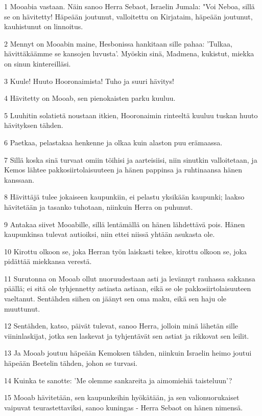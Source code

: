 \par 1 Mooabia vastaan. Näin sanoo Herra Sebaot, Israelin Jumala: "Voi Neboa, sillä se on hävitetty! Häpeään joutunut, valloitettu on Kirjataim, häpeään joutunut, kauhistunut on linnoitus.
\par 2 Mennyt on Mooabin maine, Hesbonissa hankitaan sille pahaa: 'Tulkaa, hävittäkäämme se kansojen luvusta'. Myöskin sinä, Madmena, kukistut, miekka on sinun kintereilläsi.
\par 3 Kuule! Huuto Hooronaimista! Tuho ja suuri hävitys!
\par 4 Hävitetty on Mooab, sen pienokaisten parku kuuluu.
\par 5 Luuhitin solatietä noustaan itkien, Hooronaimin rinteeltä kuuluu tuskan huuto hävityksen tähden.
\par 6 Paetkaa, pelastakaa henkenne ja olkaa kuin alaston puu erämaassa.
\par 7 Sillä koska sinä turvaat omiin töihisi ja aarteisiisi, niin sinutkin valloitetaan, ja Kemos lähtee pakkosiirtolaisuuteen ja hänen pappinsa ja ruhtinaansa hänen kanssaan.
\par 8 Hävittäjä tulee jokaiseen kaupunkiin, ei pelastu yksikään kaupunki; laakso hävitetään ja tasanko tuhotaan, niinkuin Herra on puhunut.
\par 9 Antakaa siivet Mooabille, sillä lentämällä on hänen lähdettävä pois. Hänen kaupunkinsa tulevat autioiksi, niin ettei niissä yhtään asukasta ole.
\par 10 Kirottu olkoon se, joka Herran työn laiskasti tekee, kirottu olkoon se, joka pidättää miekkansa verestä.
\par 11 Surutonna on Mooab ollut nuoruudestaan asti ja levännyt rauhassa sakkansa päällä; ei sitä ole tyhjennetty astiasta astiaan, eikä se ole pakkosiirtolaisuuteen vaeltanut. Sentähden siihen on jäänyt sen oma maku, eikä sen haju ole muuttunut.
\par 12 Sentähden, katso, päivät tulevat, sanoo Herra, jolloin minä lähetän sille viininlaskijat, jotka sen laskevat ja tyhjentävät sen astiat ja rikkovat sen leilit.
\par 13 Ja Mooab joutuu häpeään Kemoksen tähden, niinkuin Israelin heimo joutui häpeään Beetelin tähden, johon se turvasi.
\par 14 Kuinka te sanotte: 'Me olemme sankareita ja aimomiehiä taisteluun'?
\par 15 Mooab hävitetään, sen kaupunkeihin hyökätään, ja sen valionuorukaiset vaipuvat teurastettaviksi, sanoo kuningas - Herra Sebaot on hänen nimensä.
